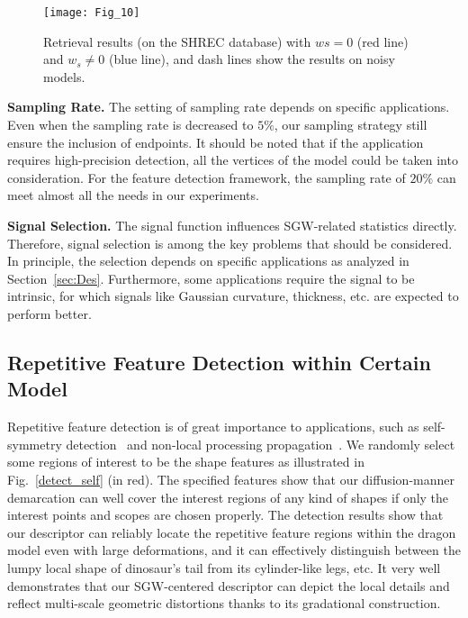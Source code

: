 \begin{figure}[!to]
\texttt{[image: Fig\_10]}
\caption[Retrieval results on the SHREC database.]
    {Retrieval results (on the SHREC database) with $ws = 0$ (red line)
    and $w_s \neq 0$ (blue line), and dash lines show the results on
    noisy models.}
\label{ws}
\end{figure}

\textbf{Sampling Rate.} The setting of sampling rate depends on
specific applications. Even when the sampling rate is decreased to
$5\%$, our sampling strategy still ensure the inclusion of endpoints.
It should be noted that if the application requires high-precision
detection, all the vertices of the model could be taken into
consideration. For the feature detection framework, the sampling rate
of $20\%$ can meet almost all the needs in our experiments.

\textbf{Signal Selection.} The signal function influences SGW-related
statistics directly. Therefore, signal selection is among the key
problems that should be considered. In principle, the selection
depends on specific applications as analyzed in Section~\ref{sec:Des}.
Furthermore, some applications require the signal to be intrinsic, for
which signals like Gaussian curvature, thickness, etc. are expected to
perform better.

\subsection{Repetitive Feature Detection within Certain Model}

Repetitive feature detection is of great importance to applications,
such as self-symmetry detection~\cite{Gal2006} and non-local
processing propagation~\cite{Maximo:2011:RRI:2027471}. We randomly
select some regions of interest to be the shape features as
illustrated in Fig.~\ref{detect_self} (in red). The specified features
show that our diffusion-manner demarcation can well cover the interest
regions of any kind of shapes if only the interest points and scopes
are chosen properly. The detection results show that our descriptor
can reliably locate the repetitive feature regions within the dragon
model even with large deformations, and it can effectively distinguish
between the lumpy local shape of dinosaur's tail from its cylinder-like
legs, etc. It very well demonstrates that our SGW-centered descriptor
can depict the local details and reflect multi-scale geometric
distortions thanks to its gradational construction.

